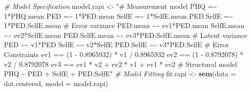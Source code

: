 \documentclass[
  man]{apa7}
\newenvironment{Shaded}{\begin{snugshade}}{\end{snugshade}}
\newcommand{\AttributeTok}[1]{\textcolor[rgb]{0.13,0.29,0.53}{#1}}
\newcommand{\CommentTok}[1]{\textcolor[rgb]{0.56,0.35,0.01}{\textit{#1}}}
\newcommand{\FunctionTok}[1]{\textcolor[rgb]{0.13,0.29,0.53}{\textbf{#1}}}
\newcommand{\NormalTok}[1]{#1}
\newcommand{\OtherTok}[1]{\textcolor[rgb]{0.56,0.35,0.01}{#1}}
\newcommand{\StringTok}[1]{\textcolor[rgb]{0.31,0.60,0.02}{#1}}
\begin{document}
\begin{Shaded}
\begin{Highlighting}[]
\CommentTok{\# Model Specification}
\NormalTok{model.rapi }\OtherTok{\textless{}{-}} \StringTok{"\# Measurement model}
\StringTok{                 PHQ =\textasciitilde{} 1*PHQ.mean}
\StringTok{                 PED =\textasciitilde{} 1*PED.mean}
\StringTok{                 SelfE =\textasciitilde{} 1*SelfE.mean}
\StringTok{                 PED.SelfE =\textasciitilde{} 1*PED.SelfE.mean}
\StringTok{               \# Error variance}
\StringTok{                 PED.mean \textasciitilde{}\textasciitilde{} ev1*PED.mean}
\StringTok{                 SelfE.mean \textasciitilde{}\textasciitilde{} ev2*SelfE.mean}
\StringTok{                 PED.SelfE.mean \textasciitilde{}\textasciitilde{} ev3*PED.SelfE.mean}
\StringTok{               \# Latent variance}
\StringTok{                 PED \textasciitilde{}\textasciitilde{} v1*PED}
\StringTok{                 SelfE \textasciitilde{}\textasciitilde{} v2*SelfE}
\StringTok{                 PED.SelfE \textasciitilde{}\textasciitilde{} v3*PED.SelfE}
\StringTok{               \# Error Constraints}
\StringTok{                 ev1 == (1 {-} 0.8965932) * v1 / 0.8965932}
\StringTok{                 ev2 == (1 {-} 0.8792078) * v2 / 0.8792078}
\StringTok{                 ev3 == ev1 * v2 + ev2 * v1 + ev1 * ev2}
\StringTok{               \# Structural model}
\StringTok{                 PHQ \textasciitilde{} PED + SelfE + PED.SelfE"}
\CommentTok{\# Model Fitting}
\NormalTok{fit.rapi }\OtherTok{\textless{}{-}} \FunctionTok{sem}\NormalTok{(}\AttributeTok{data =}\NormalTok{ dat.centered, }\AttributeTok{model =}\NormalTok{ model.rapi)}
\end{Highlighting}
\end{Shaded}
\end{document}
